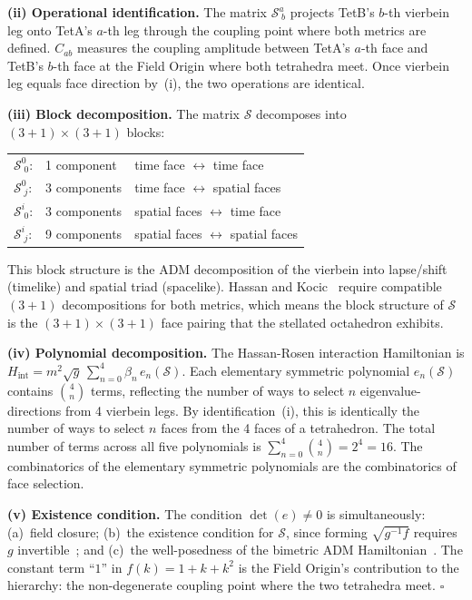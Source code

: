 \documentclass[aps,prd,preprint,superscriptaddress,showpacs,preprintnumbers,amsmath,amssymb,nofootinbib]{revtex4-2}
\begin{document}
\textbf{(ii) Operational identification.} The matrix $\mathcal{S}^a_{\;b}$ projects TetB's $b$-th vierbein leg onto TetA's $a$-th leg through the coupling point where both metrics are defined. $C_{ab}$ measures the coupling amplitude between TetA's $a$-th face and TetB's $b$-th face at the Field Origin where both tetrahedra meet. Once vierbein leg equals face direction by~(i), the two operations are identical.

\textbf{(iii) Block decomposition.} The matrix $\mathcal{S}$ decomposes into $(3{+}1) \times (3{+}1)$ blocks:
\begin{center}
\renewcommand{\arraystretch}{1.2}
\begin{tabular}{@{}lll@{}}
$\mathcal{S}^0_{\;0}$: & 1 component & time face $\leftrightarrow$ time face \\
$\mathcal{S}^0_{\;j}$: & 3 components & time face $\leftrightarrow$ spatial faces \\
$\mathcal{S}^i_{\;0}$: & 3 components & spatial faces $\leftrightarrow$ time face \\
$\mathcal{S}^i_{\;j}$: & 9 components & spatial faces $\leftrightarrow$ spatial faces \\
\end{tabular}
\end{center}
This block structure is the ADM decomposition of the vierbein into lapse/shift (timelike) and spatial triad (spacelike). Hassan and Kocic~\cite{hassankocic2018} require compatible $(3{+}1)$ decompositions for both metrics, which means the block structure of $\mathcal{S}$ is the $(3{+}1) \times (3{+}1)$ face pairing that the stellated octahedron exhibits.

\textbf{(iv) Polynomial decomposition.} The Hassan-Rosen interaction Hamiltonian is $H_{\text{int}} = m^2\sqrt{g}\,\sum_{n=0}^{4}\beta_n\,e_n(\mathcal{S})$. Each elementary symmetric polynomial $e_n(\mathcal{S})$ contains $\binom{4}{n}$ terms, reflecting the number of ways to select $n$ eigenvalue-directions from 4 vierbein legs. By identification~(i), this is identically the number of ways to select $n$ faces from the 4 faces of a tetrahedron. The total number of terms across all five polynomials is $\sum_{n=0}^{4}\binom{4}{n} = 2^4 = 16$. The combinatorics of the elementary symmetric polynomials are the combinatorics of face selection.

\textbf{(v) Existence condition.} The condition $\det(e) \neq 0$ is simultaneously: (a)~field closure; (b)~the existence condition for $\mathcal{S}$, since forming $\sqrt{g^{-1}f}$ requires $g$ invertible~\cite{deffayet2013}; and (c)~the well-posedness of the bimetric ADM Hamiltonian~\cite{hassankocic2018}. The constant term ``$1$'' in $f(k) = 1 + k + k^2$ is the Field Origin's contribution to the hierarchy: the non-degenerate coupling point where the two tetrahedra meet. \hfill$\square$
\end{document}

